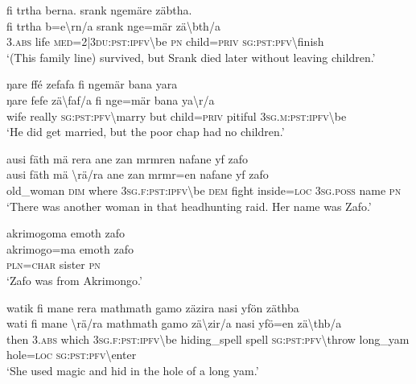 \ea\label{ex:4:a1728}
fi trtha berna. srank ngemäre zäbtha.\\
\gll fi	trtha	b=e{\textbackslash}rn/a	srank	nge=mär	zä{\textbackslash}bth/a\\
     3.\textsc{abs}	life	\textsc{med}=2|3\textsc{du}:\textsc{pst}:\textsc{ipfv}{\textbackslash}be	\textsc{pn}	child=\textsc{priv}	\textsc{sg}:\textsc{pst}:\textsc{pfv}{\textbackslash}finish\\
\glt `(This family line) survived, but Srank died later without leaving children.'
\z

\ea\label{ex:4:a1729}
ŋare ffé zefafa fi ngemär bana yara\\
\gll ŋare	fefe	zä{\textbackslash}faf/a	fi	nge=mär	bana	ya{\textbackslash}r/a\\
     wife	really	\textsc{sg}:\textsc{pst}:\textsc{pfv}{\textbackslash}marry	but	child=\textsc{priv}	pitiful	3\textsc{sg}.\textsc{m}:\textsc{pst}:\textsc{ipfv}{\textbackslash}be\\
\glt `He did get married, but the poor chap had no children.'
\z

\ea\label{ex:4:a1730}
ausi fäth mä rera ane zan mrmren nafane yf zafo\\
\gll ausi	fäth	mä	{\textbackslash}rä/ra	ane	zan	mrmr=en	nafane	yf	zafo\\
     old\_woman	\textsc{dim}	where	3\textsc{sg}.\textsc{f}:\textsc{pst}:\textsc{ipfv}{\textbackslash}be	\textsc{dem}	fight	inside=\textsc{loc}	3\textsc{sg}.\textsc{poss}	name	\textsc{pn}\\
\glt `There was another woman in that headhunting raid. Her name was Zafo.'
\z

\ea\label{ex:4:a1731}
akrimogoma emoth zafo\\
\gll akrimogo=ma	emoth	zafo\\
     \textsc{pln}=\textsc{char}	sister	\textsc{pn}\\
\glt `Zafo was from Akrimongo.'
\z

\ea\label{ex:4:a1732}
watik fi mane rera mathmath gamo zäzira nasi yfön zäthba\\
\gll wati	fi	mane	{\textbackslash}rä/ra	mathmath	gamo	zä{\textbackslash}zir/a	nasi	yfö=en	zä{\textbackslash}thb/a\\
     then	3.\textsc{abs}	which	3\textsc{sg}.\textsc{f}:\textsc{pst}:\textsc{ipfv}{\textbackslash}be	hiding\_spell	spell	\textsc{sg}:\textsc{pst}:\textsc{pfv}{\textbackslash}throw	long\_yam	hole=\textsc{loc}	\textsc{sg}:\textsc{pst}:\textsc{pfv}{\textbackslash}enter\\
\glt `She used magic and hid in the hole of a long yam.'
\z

